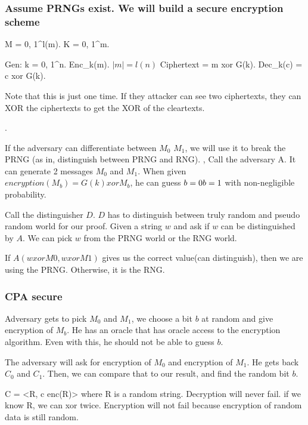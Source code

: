 \subsubsection{Assume PRNGs exist. We will build a secure encryption scheme}

M = {0, 1}^{l(m)}. K = {0, 1}^m.

Gen: k = {0, 1}^n. Enc_k(m). $|m| = l(n)$ 
Ciphertext = m xor G(k).
Dec_k(c) = c xor G(k).

Note that this is just one time. If they attacker can see two ciphertexts, they can XOR the ciphertexts to get the XOR of the cleartexts.

.

If the adversary can differentiate between $M_0$ $M_1$, we will use it to break the PRNG (as in, distinguish between PRNG and RNG).
, 
Call the adversary A. It can generate 2 messages $M_0$ and $M_1$. When given $encryption(M_b) = G(k) xor M_b$, he can guess $b = 0 \/ b = 1$ with non-negligible probability.

Call the distinguisher $D$. $D$ has to distinguish between truly random and pseudo random world for our proof.
Given a string $w$ and ask if $w$ can be distinguished by $A$. We can pick $w$ from the PRNG world or the RNG world.

If $A(w xor M0, w xor M1)$ gives us the  correct value(can distinguish), then we are using the PRNG. Otherwise, it is the RNG.


\subsubsection{CPA secure}

Adversary gets to pick $M_0$ and $M_1$, we choose a bit $b$ at random and give encryption of $M_b$. He has an oracle that has oracle access to the encryption algorithm. Even with this, he should not be able to guess $b$.


The adversary will ask for encryption of $M_0$ and encryption of $M_1$. He gets back $C_0$ and $C_1$. Then, we can compare that to our result, and find the random bit $b$.


C = <R, c \xor enc(R)> where R is a random string.
Decryption will never fail. if we know R, we can xor twice.
Encryption will not fail because encryption of random data is still random.

